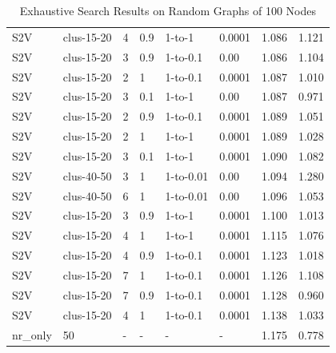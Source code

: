 \documentclass[10pt,a4paper,draft]{article}
\begin{document}
\begin{table}[]
\begin{tabular}{@{}llllllll@{}}
S2V             & clus-15-20          & 4          & 0.9          & 1-to-1          & 0.0001        & 1.086          & 1.121           \\
S2V             & clus-15-20          & 3          & 0.9          & 1-to-0.1        & 0.00          & 1.086          & 1.104           \\
S2V             & clus-15-20          & 2          & 1            & 1-to-0.1        & 0.0001        & 1.087          & 1.010           \\
S2V             & clus-15-20          & 3          & 0.1          & 1-to-1          & 0.00          & 1.087          & 0.971           \\
S2V             & clus-15-20          & 2          & 0.9          & 1-to-0.1        & 0.0001        & 1.089          & 1.051           \\
S2V             & clus-15-20          & 2          & 1            & 1-to-1          & 0.0001        & 1.089          & 1.028           \\
S2V             & clus-15-20          & 3          & 0.1          & 1-to-1          & 0.0001        & 1.090          & 1.082           \\
S2V             & clus-40-50          & 3          & 1            & 1-to-0.01       & 0.00          & 1.094          & 1.280           \\
S2V             & clus-40-50          & 6          & 1            & 1-to-0.01       & 0.00          & 1.096          & 1.053           \\
S2V             & clus-15-20          & 3          & 0.9          & 1-to-1          & 0.0001        & 1.100          & 1.013           \\
S2V             & clus-15-20          & 4          & 1            & 1-to-1          & 0.0001        & 1.115          & 1.076           \\
S2V             & clus-15-20          & 4          & 0.9          & 1-to-0.1        & 0.0001        & 1.123          & 1.018           \\
S2V             & clus-15-20          & 7          & 1            & 1-to-0.1        & 0.0001        & 1.126          & 1.108           \\
S2V             & clus-15-20          & 7          & 0.9          & 1-to-0.1        & 0.0001        & 1.128          & 0.960           \\
S2V             & clus-15-20          & 4          & 1            & 1-to-0.1        & 0.0001        & 1.138          & 1.033           \\
nr\_only        & 50                  & -          & -            & -               & -             & 1.175          & 0.778           \\ \bottomrule
\end{tabular}
\caption{Exhaustive Search Results on Random Graphs of 100 Nodes}
\label{exhastive-search-results100}
\end{table}
    
\end{document}
